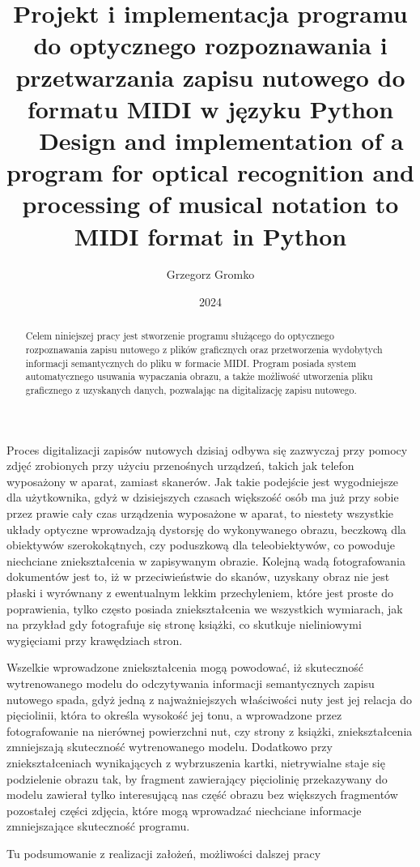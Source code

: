 \documentclass[xodstep]{wnspt}
\author      {Grzegorz Gromko}
\date        {2024}
\title{ Projekt i implementacja programu do optycznego rozpoznawania i przetwarzania zapisu nutowego do formatu MIDI w języku Python
\\{~}
Design and implementation of a program for optical recognition and processing of musical notation to MIDI format in Python}
\begin{document}
\maketitle
\onehalfspacing

\begin{abstract}
	Celem niniejszej pracy jest stworzenie programu służącego do optycznego rozpoznawania zapisu nutowego z plików graficznych oraz przetworzenia wydobytych informacji semantycznych do pliku w formacie MIDI. Program posiada system automatycznego usuwania wypaczania obrazu, a także możliwość utworzenia pliku graficznego z uzyskanych danych, pozwalając na digitalizację zapisu nutowego.
\end{abstract}



\introduction


Proces digitalizacji zapisów nutowych dzisiaj odbywa się zazwyczaj przy pomocy zdjęć zrobionych przy użyciu przenośnych urządzeń, takich jak telefon wyposażony w aparat, zamiast skanerów. Jak takie podejście jest wygodniejsze dla użytkownika, gdyż w dzisiejszych czasach większość osób ma już przy sobie przez prawie cały czas urządzenia wyposażone w aparat, to niestety wszystkie układy optyczne wprowadzają dystorsję do wykonywanego obrazu, beczkową dla obiektywów szerokokątnych, czy poduszkową dla teleobiektywów, co powoduje niechciane zniekształcenia w zapisywanym obrazie. Kolejną wadą fotografowania dokumentów jest to, iż w przeciwieństwie do skanów, uzyskany obraz nie jest płaski i wyrównany z ewentualnym lekkim przechyleniem, które jest proste do poprawienia, tylko często posiada zniekształcenia we wszystkich wymiarach, jak na przykład gdy fotografuje się stronę książki, co skutkuje nieliniowymi wygięciami przy krawędziach stron. 

Wszelkie wprowadzone zniekształcenia mogą powodować, iż skuteczność wytrenowanego modelu do odczytywania informacji semantycznych zapisu nutowego spada, gdyż jedną z najważniejszych właściwości nuty jest jej relacja do pięciolinii, która to określa wysokość jej tonu, a wprowadzone przez fotografowanie na nierównej powierzchni nut, czy strony z książki, zniekształcenia zmniejszają skuteczność wytrenowanego modelu. Dodatkowo przy zniekształceniach wynikających z wybrzuszenia kartki, nietrywialne staje się podzielenie obrazu tak, by fragment zawierający pięciolinię przekazywany do modelu zawierał tylko interesującą nas część obrazu bez większych fragmentów pozostałej części zdjęcia, które mogą wprowadzać niechciane informacje zmniejszające skuteczność programu.







\summary
Tu podsumowanie z realizacji założeń, możliwości dalszej pracy




\listoftables

\listoffigures

\lstlistoflistings
\end{document}

